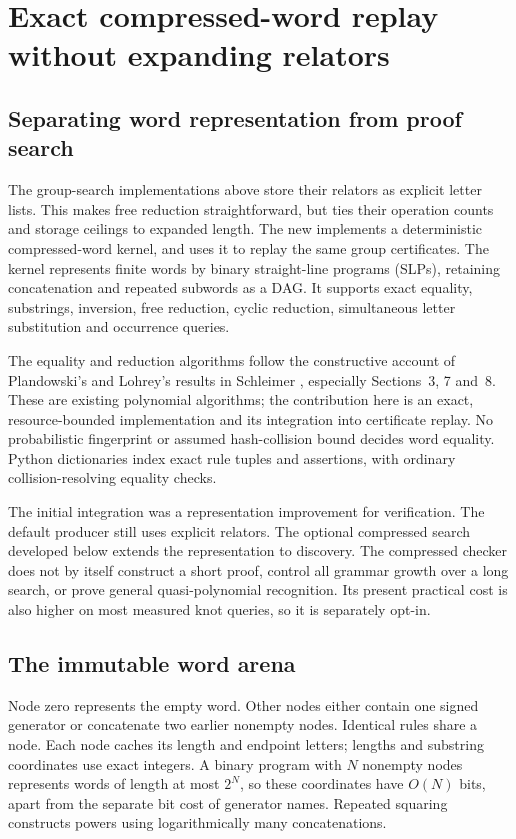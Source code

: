 \section{Exact compressed-word replay without expanding relators}
\label{sec:compressed-words}

\subsection{Separating word representation from proof search}

The group-search implementations above store their relators as explicit
letter lists.  This makes free reduction straightforward, but ties their
operation counts and storage ceilings to expanded length.  The new
 implements a deterministic compressed-word
kernel, and  uses it to replay the same group
certificates.  The kernel represents finite words by binary straight-line
programs (SLPs), retaining concatenation and repeated subwords as a DAG.
It supports exact equality, substrings, inversion, free reduction, cyclic
reduction, simultaneous letter substitution and occurrence queries.

The equality and reduction algorithms follow the constructive account of
Plandowski's and Lohrey's results in Schleimer
\cite{schleimer-compressed}, especially Sections~3, 7 and~8.  These are
existing polynomial algorithms; the contribution here is an exact,
resource-bounded implementation and its integration into certificate replay.
No probabilistic fingerprint or assumed hash-collision bound decides word
equality.  Python dictionaries index exact rule tuples and assertions,
with ordinary collision-resolving equality checks.

The initial integration was a representation improvement for verification.
The default producer still uses explicit relators.  The optional compressed
search developed below extends the representation to discovery.  The compressed
checker does not by itself construct a short proof, control all grammar
growth over a long search, or prove general quasi-polynomial recognition.
Its present practical cost is also higher on most measured knot queries,
so it is separately opt-in.

\subsection{The immutable word arena}

Node zero represents the empty word.  Other nodes either contain one
signed generator or concatenate two earlier nonempty nodes.  Identical
rules share a node.  Each node caches its length and endpoint letters;
lengths and substring coordinates use exact integers.  A binary program
with $N$ nonempty nodes represents words of length at most $2^N$, so
these coordinates have $O(N)$ bits, apart from the separate bit cost of
generator names.  Repeated squaring constructs powers using logarithmically
many concatenations.

